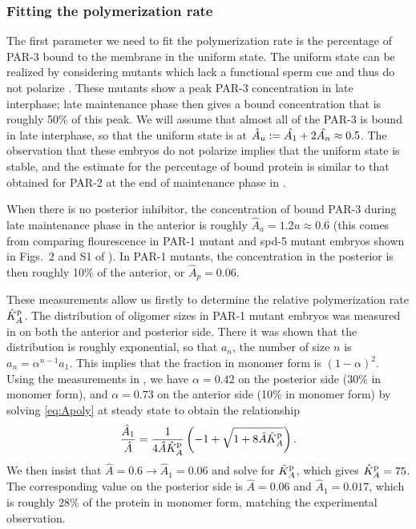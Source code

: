 \documentclass[11pt]{article}
\newcommand{\6}[1]{#1_{\text{6}}}
\newcommand{\3}[1]{#1_{\text{3}}}
\begin{document}
\subsubsection{Fitting the polymerization rate}
The first parameter we need to fit the polymerization rate is the percentage of PAR-3 bound to the membrane in the uniform state. The uniform state can be realized by considering mutants which lack a functional sperm cue and thus do not polarize \cite[Fig.~S1]{lang2023oligomerization}. These mutants show a peak PAR-3 concentration in late interphase; late maintenance phase then gives a bound concentration that is roughly 50\% of this peak. We will assume that almost all of the PAR-3 is bound in late interphase, so that the uniform state is at $\hat A_u:=\hat{A_1}+2\hat{A_n} \approx 0.5$. The observation that these embryos do not polarize implies that the uniform state is stable, and the estimate for the percentage of bound protein is similar to that obtained for PAR-2 at the end of maintenance phase in \cite[Fig.~S3]{gross2019guiding}. 

When there is no posterior inhibitor, the concentration of bound PAR-3 during late maintenance phase in the anterior is roughly $\hat A_a=1.2u \approx 0.6$ (this comes from comparing flourescence in PAR-1 mutant and spd-5 mutant embryos shown in Figs.\ 2 and S1 of \cite{lang2023oligomerization}). In PAR-1 mutants, the concentration in the posterior is then roughly 10\% of the anterior, or $\hat A_p=0.06$. 

These measurements allow us firstly to determine the relative polymerization rate $\hat{K}^\text{p}_A$. The distribution of oligomer sizes in PAR-1 mutant embryos was measured in \cite{lang2023oligomerization} on both the anterior and posterior side. There it was shown that the distribution is roughly exponential, so that $a_n$, the number of size $n$ is $a_n=\alpha^{n-1} a_1$. This implies that the fraction in monomer form is $\left(1-\alpha\right)^2$. Using the measurements in \cite{lang2023oligomerization}, we have $\alpha=0.42$ on the posterior side (30\% in monomer form), and $\alpha=0.73$ on the anterior side (10\% in monomer form) by solving \eqref{eq:Apoly} at steady state to obtain the relationship
\begin{equation}
\frac{\hat A_1}{\hat A} = \frac{1}{4 \hat A \hat{K}^\text{p}_A}\left(-1+\sqrt{1+8 \hat A \hat{K}^\text{p}_A}\right).
\end{equation}
We then insist that $\hat A=0.6 \rightarrow \hat A_1=0.06$ and solve for $\hat{K}^\text{p}_A$, which gives $\hat{K}^\text{p}_A=75$. The corresponding value on the posterior side is $\hat A = 0.06$ and $\hat A_1=0.017$, which is roughly 28\% of the protein in monomer form, matching the experimental observation.
\end{document}
